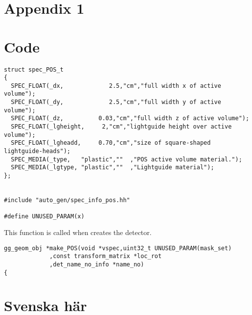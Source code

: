 \newpage
\appendix
{}
\chapter{Appendix 1}
\label{app:1}

\chapter{Code}
\label{app:code}

\lstset{language=C++ ,basicstyle=\footnotesize, breaklines=true, %
xleftmargin=11pt, xrightmargin=11pt
}
\begin{lstlisting}
struct spec_POS_t
{
  SPEC_FLOAT(_dx,             2.5,"cm","full width x of active volume");
  SPEC_FLOAT(_dy,             2.5,"cm","full width y of active volume");
  SPEC_FLOAT(_dz,          0.03,"cm","full width z of active volume");
  SPEC_FLOAT(_lgheight,     2,"cm","lightguide height over active volume");
  SPEC_FLOAT(_lgheadd,     0.70,"cm","size of square-shaped lightguide-heads");
  SPEC_MEDIA(_type,   "plastic",""  ,"POS active volume material.");
  SPEC_MEDIA(_lgtype, "plastic",""  ,"Lightguide material");
};


#include "auto_gen/spec_info_pos.hh"

#define UNUSED_PARAM(x)
\end{lstlisting}
This function is called when  creates the detector.
\begin{lstlisting}
gg_geom_obj *make_POS(void *vspec,uint32_t UNUSED_PARAM(mask_set)
		     ,const transform_matrix *loc_rot
		     ,det_name_no_info *name_no)
{
\end{lstlisting}


\clearpage
\def\figureautorefname{figur}
\def\appendixautorefname{avsnitt}
\def\chapterautorefname{avsnitt}
\def\sectionautorefname{avsnitt}
\def\subsectionautorefname{avsnitt}
\def\subsubsectionautorefname{avsnitt}
\def\equationautorefname{ekvation}
\renewcommand{\abbrev}[2]{#1\footnote{#2}}
\chapter{Svenska här}


